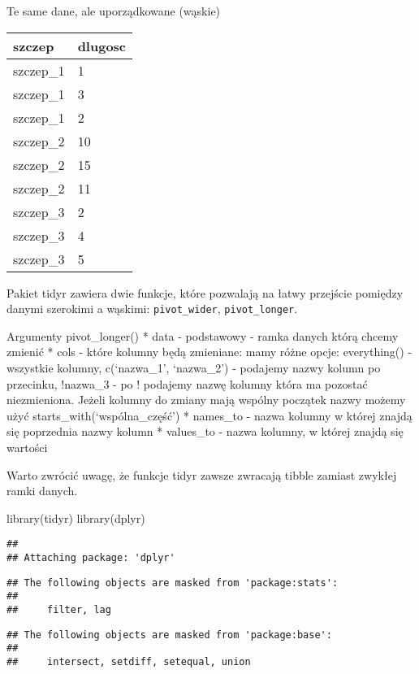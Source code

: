 \documentclass[
]{book}
\newenvironment{Shaded}{\begin{snugshade}}{\end{snugshade}}
\newcommand{\FunctionTok}[1]{\textcolor[rgb]{0.00,0.00,0.00}{#1}}
\newcommand{\NormalTok}[1]{#1}
\begin{document}
Te same dane, ale uporządkowane (wąskie)

\begin{longtable}[]{@{}ll@{}}
\toprule
szczep & dlugosc \\
\midrule
\endhead
szczep\_1 & 1 \\
szczep\_1 & 3 \\
szczep\_1 & 2 \\
szczep\_2 & 10 \\
szczep\_2 & 15 \\
szczep\_2 & 11 \\
szczep\_3 & 2 \\
szczep\_3 & 4 \\
szczep\_3 & 5 \\
\bottomrule
\end{longtable}

Pakiet tidyr zawiera dwie funkcje, które pozwalają na łatwy przejście pomiędzy danymi szerokimi a wąskimi: \texttt{pivot\_wider}, \texttt{pivot\_longer}.

Argumenty pivot\_longer()
* data - podstawowy - ramka danych którą chcemy zmienić
* cols - które kolumny będą zmieniane: mamy różne opcje: everything() - wszystkie kolumny, c(`nazwa\_1', `nazwa\_2') - podajemy nazwy kolumn po przecinku, !nazwa\_3 - po ! podajemy nazwę kolumny która ma pozostać niezmieniona. Jeżeli kolumny do zmiany mają wspólny początek nazwy możemy użyć starts\_with(`wspólna\_część')
* names\_to - nazwa kolumny w której znajdą się poprzednia nazwy kolumn
* values\_to - nazwa kolumny, w której znajdą się wartości

Warto zwrócić uwagę, że funkcje tidyr zawsze zwracają tibble zamiast zwykłej ramki danych.

\begin{Shaded}
\begin{Highlighting}[]
\FunctionTok{library}\NormalTok{(tidyr)}
\FunctionTok{library}\NormalTok{(dplyr)}
\end{Highlighting}
\end{Shaded}

\begin{verbatim}
## 
## Attaching package: 'dplyr'
\end{verbatim}

\begin{verbatim}
## The following objects are masked from 'package:stats':
## 
##     filter, lag
\end{verbatim}

\begin{verbatim}
## The following objects are masked from 'package:base':
## 
##     intersect, setdiff, setequal, union
\end{verbatim}
\end{document}
